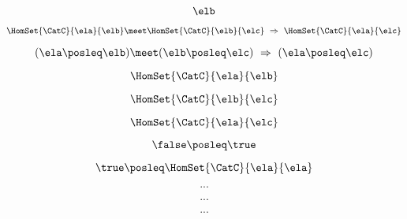 \begin{forslides}
     \begin{equation}
        \label{eq:slides_enrichment_11}
       \elb
    \end{equation}
    
     \begin{equation}
        \label{eq:slides_enrichment_12}
       \HomSet{\CatC}{\ela}{\elb} \meet \HomSet{\CatC}{\elb}{\elc} \ \Rightarrow \ \HomSet{\CatC}{\ela}{\elc}
    \end{equation}
    
     \begin{equation}
        \label{eq:slides_enrichment_13}
      (\ela \posleq \elb) \meet (\elb \posleq \elc) \ \Rightarrow \ (\ela \posleq \elc)
    \end{equation}
    
     \begin{equation}
        \label{eq:slides_enrichment_14}
       \HomSet{\CatC}{\ela}{\elb}
    \end{equation}
    
     \begin{equation}
        \label{eq:slides_enrichment_15}
      \HomSet{\CatC}{\elb}{\elc}
    \end{equation}
    
     \begin{equation}
        \label{eq:slides_enrichment_16}
      \HomSet{\CatC}{\ela}{\elc}
    \end{equation}
    
     \begin{equation}
        \label{eq:slides_enrichment_17}
      \false \posleq \true
    \end{equation}
    
    \begin{equation}
        \label{eq:slides_enrichment_18}
        \true \posleq \HomSet{\CatC}{\ela}{\ela}
    \end{equation}
    
     \begin{equation}
        \label{eq:slides_enrichment_19}
       ...
    \end{equation}
    
     \begin{equation}
        \label{eq:slides_enrichment_20}
       ...
    \end{equation}
    
     \begin{equation}
        \label{eq:slides_enrichment_21}
       ...
    \end{equation}
    

\end{forslides}
